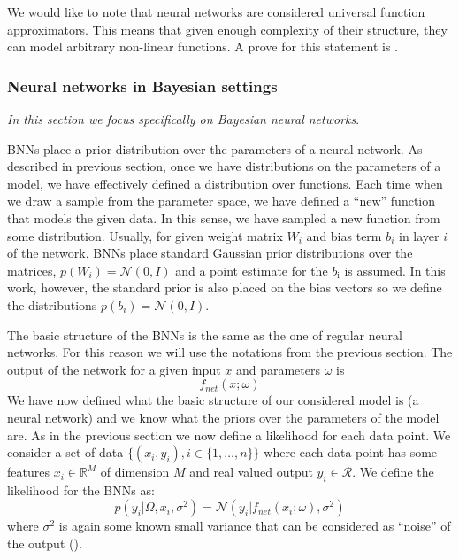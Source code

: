 \documentclass[12pt,a4paper,twoside]{scrartcl}
\numberwithin{equation}{section}
\begin{document}
We would like to note that neural networks are considered universal function approximators. This means that given enough complexity of their structure, they can model arbitrary non-linear functions. A prove for this statement is \cite{hornik1989}.
\subsubsection{Neural networks in Bayesian settings}\label{sec:nn-in-bayesian}
\noindent\emph{In this section we focus specifically on Bayesian neural networks}.

BNNs place a prior distribution over the parameters of a neural network. As described in previous section, once we have distributions on the parameters of a model, we have effectively defined a distribution over functions. Each time when we draw a sample from the parameter space, we have defined a ``new'' function that models the given data. In this sense, we have sampled a new function from some distribution. Usually, for given weight matrix \(W_i\) and bias term \(b_i\) in layer \(i\) of the network, BNNs place standard Gaussian prior distributions over the matrices, \(p(W_i)=\mathcal{N}(0,I)\) and a point estimate for the \(b_{\text{i}}\) is assumed. In this work, however, the standard prior is also placed on the bias vectors so we define the distributions \(p(b_i)=\mathcal{N}(0,I)\).

The basic structure of the BNNs is the same as the one of regular neural networks. For this reason we will use the notations from the previous section. The output of the network for a given input \(x\) and parameters \(\omega\) is
\begin{equation}
  f_{net}(x;\omega)
\end{equation}
We have now defined what the basic structure of our considered model is (a neural network) and we know what the priors over the parameters of the model are. As in the previous section we now define a likelihood for each data point. We consider a set of data \(\{(x_i, y_i), i\in\{1,\ldots ,n\} \}\) where each data point has some features \(x_i\in\mathbb{R}^M\) of dimension \(M\) and real valued output \(y_i\in\mathcal{R}\). We define the likelihood for the BNNs as:
\begin{equation}
  p(y_i|\Omega, x_i, \sigma^2) = \mathcal{N}(y_i |f_{net}(x_i;\omega), \sigma^2)
\end{equation}
where \(\sigma^{\text{2}}\) is again some known small variance that can be considered as ``noise'' of the output (\cite{gal2016}).
\end{document}
